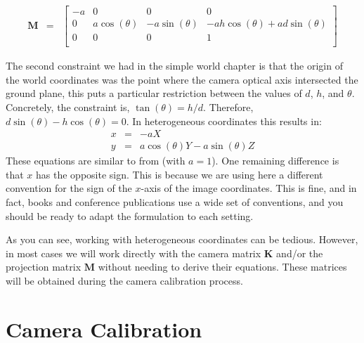 \begin{eqnarray}
    \mathbf{M} 
    &=& 
    \begin{bmatrix}
    -a & 0 & 0 & 0 \\
    0 & a\cos (\theta) & -a\sin (\theta) & -ah \cos (\theta) +ad \sin (\theta) \\
    0 & 0 & 0 & 1 \\
    \end{bmatrix}
    \label{eq:model4}
\end{eqnarray}




The second constraint we had in the simple world chapter is that the origin of the world coordinates was the point where the camera optical axis intersected the ground plane, this puts a particular restriction between the values of $d$, $h$, and $\theta$. Concretely, the constraint is, $\tan (\theta) = h/d$. Therefore, $d \sin(\theta) - h \cos (\theta) = 0$. In heterogeneous coordinates this results in:
\begin{eqnarray}
x &=& -a X\\
y &=& a \cos (\theta) Y - a\sin(\theta) Z
\end{eqnarray}
These equations are similar to \eqn{\ref{eq:projection}} from \chap{\ref{chapter:simplesystem}} (with $a=1$). One remaining difference is that $x$ has the opposite sign. This is because we are using here a different convention for the sign of the $x$-axis of the image coordinates. This is fine, and in fact, books and conference publications use a wide set of conventions, and you should be ready to adapt the formulation to each setting. 

As you can see, working with heterogeneous coordinates can be tedious. However, in most cases we will work directly with the camera matrix $\mathbf{K}$ and/or the projection matrix $\mathbf{M}$ without needing to derive their equations. These matrices will be obtained during the camera calibration process. 

\section{Camera Calibration}
\label{sec:camera_calibration}


